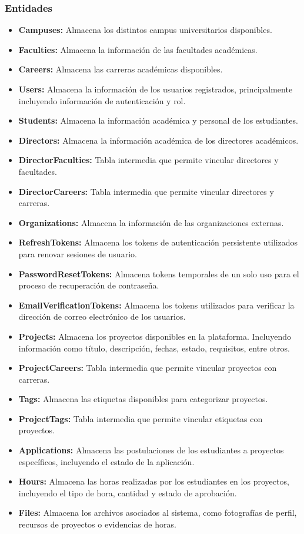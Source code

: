 \subsubsection{Entidades}
\begin{itemize}
    \item \textbf{Campuses:} Almacena los distintos campus universitarios disponibles.
    \item \textbf{Faculties:} Almacena la información de las facultades académicas.
    \item \textbf{Careers:} Almacena las carreras académicas disponibles.
    \item \textbf{Users:} Almacena la información de los usuarios registrados, principalmente incluyendo información de
            autenticación y rol.
    \item \textbf{Students:} Almacena la información académica y personal de los estudiantes.
    \item \textbf{Directors:} Almacena la información académica de los directores académicos.
    \item \textbf{DirectorFaculties:} Tabla intermedia que permite vincular directores y facultades.
    \item \textbf{DirectorCareers:} Tabla intermedia que permite vincular directores y carreras.
    \item \textbf{Organizations:} Almacena la información de las organizaciones externas.
    \item \textbf{RefreshTokens:} Almacena los tokens de autenticación persistente utilizados para renovar sesiones de usuario.
    \item \textbf{PasswordResetTokens:} Almacena tokens temporales de un solo uso para el proceso de recuperación de contraseña.
    \item \textbf{EmailVerificationTokens:} Almacena los tokens utilizados para verificar la dirección de correo electrónico
            de los usuarios.
    \item \textbf{Projects:} Almacena los proyectos disponibles en la plataforma. Incluyendo información como título, descripción,
            fechas, estado, requisitos, entre otros.
    \item \textbf{ProjectCareers:} Tabla intermedia que permite vincular proyectos con carreras.
    \item \textbf{Tags:} Almacena las etiquetas disponibles para categorizar proyectos.
    \item \textbf{ProjectTags:} Tabla intermedia que permite vincular etiquetas con proyectos.
    \item \textbf{Applications:} Almacena las postulaciones de los estudiantes a proyectos específicos, incluyendo el estado de
            la aplicación.
    \item \textbf{Hours:} Almacena las horas realizadas por los estudiantes en los proyectos, incluyendo el tipo de hora,
            cantidad y estado de aprobación.
    \item \textbf{Files:} Almacena los archivos asociados al sistema, como fotografías de perfil, recursos de proyectos o
            evidencias de horas.
\end{itemize}

